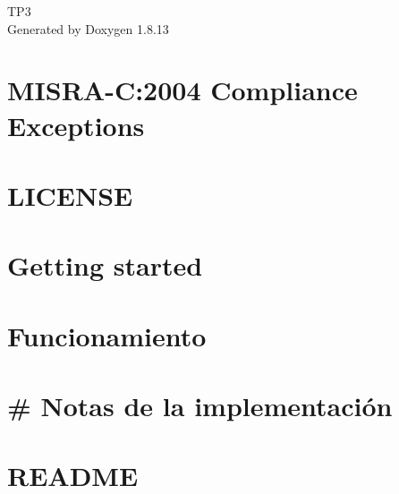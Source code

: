 \documentclass[twoside]{book}
\newcommand{\+}{\discretionary{\mbox{\scriptsize$\hookleftarrow$}}{}{}}
\newcommand{\clearemptydoublepage}{%
  \newpage{\pagestyle{empty}\cleardoublepage}%
}
\begin{document}
\hypersetup{pageanchor=false,
             bookmarksnumbered=true,
             pdfencoding=unicode
            }
\begin{titlepage}
\vspace*{7cm}
\begin{center}%
{\Large T\+P3 }\\
\vspace*{1cm}
{\large Generated by Doxygen 1.8.13}\\
\end{center}
\end{titlepage}
\clearemptydoublepage
{}
\tableofcontents
\clearemptydoublepage
{}
\hypersetup{pageanchor=true}

\chapter{M\+I\+S\+R\+A-\/C\+:2004 Compliance Exceptions}
\label{_c_m_s_i_s__m_i_s_r_a__exceptions}

\chapter{L\+I\+C\+E\+N\+SE}
\label{md_muju_externals_freertos__l_i_c_e_n_s_e}

\chapter{Getting started}
\label{md_muju_externals_freertos__r_e_a_d_m_e}

\chapter{Funcionamiento}
\label{md_muju_modules_base__r_e_a_d_m_e}

\chapter{\# Notas de la implementación}
\label{md_muju_modules_freertos_readme}

\chapter{R\+E\+A\+D\+ME}
\label{md_muju__r_e_a_d_m_e}

\end{document}
